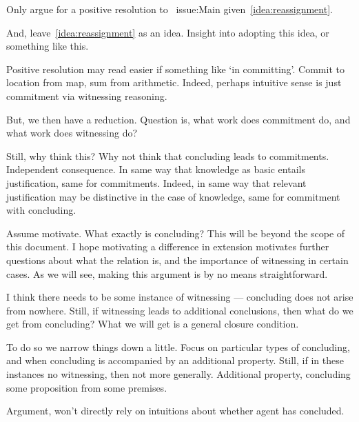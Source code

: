 \begin{note}[???]
  Only argue for a positive resolution to~{\color{red} issue:Main} given~\autoref{idea:reassignment}.

  And, leave~\autoref{idea:reassignment} as an idea.
  Insight into adopting this idea, or something like this.
\end{note}

\begin{note}
  Positive resolution may read easier if something like `in committing'.
  Commit to location from map, sum from arithmetic.
  Indeed, perhaps intuitive sense is just commitment via witnessing reasoning.

  But, we then have a reduction.
  Question is, what work does commitment do, and what work does witnessing do?

  Still, why think this?
  Why not think that concluding leads to commitments.
  Independent consequence.
  In same way that knowledge as basic entails justification, same for commitments.
  Indeed, in same way that relevant justification may be distinctive in the case of knowledge, same for commitment with concluding.
\end{note}

\begin{note}
  Assume motivate.
  What exactly is concluding?
  This will be beyond the scope of this document.
  I hope motivating a difference in extension motivates further questions about what the relation is, and the importance of witnessing in certain cases.
  As we will see, making this argument is by no means straightforward.

  I think there needs to be some instance of witnessing --- concluding does not arise from nowhere.
  Still, if witnessing leads to additional conclusions, then what do we get from concluding?
  What we will get is a general closure condition.

  To do so we narrow things down a little.
  Focus on particular types of concluding, and when concluding is accompanied by an additional property.
  Still, if in these instances no witnessing, then not more generally.
  Additional property, concluding some proposition from some premises.

  Argument, won't directly rely on intuitions about whether agent has concluded.
\end{note}

